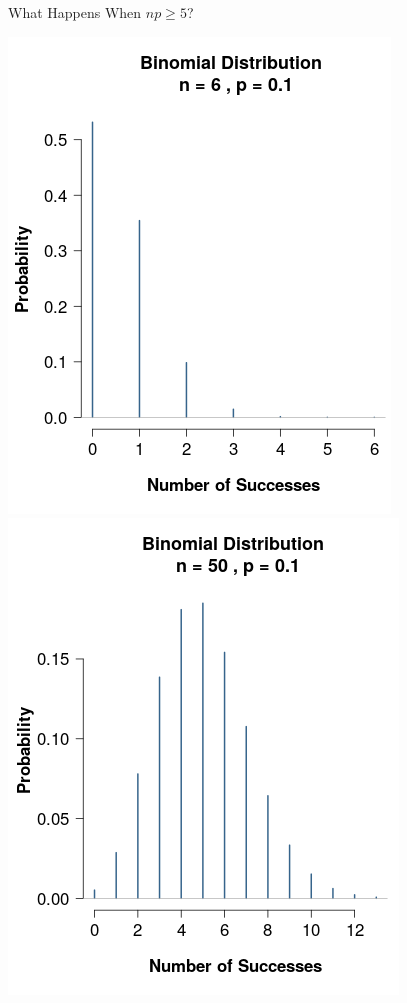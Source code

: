 \documentclass{beamer}
\begin{document}
\begin{frame}{What Happens When $np \geq 5$? }

\includegraphics[scale=0.34]{images/section4BinomNP1.png}
\includegraphics[scale=0.34]{images/section4BinomNP2.png}

\end{frame}
\end{document}
